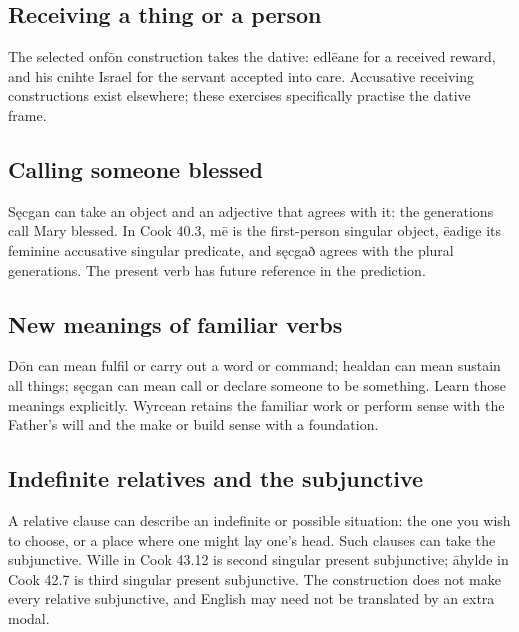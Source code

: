 \subsection*{Receiving a thing or a person}

The selected onfōn construction takes the dative: edlēane for a received reward, and his cnihte Israel for the servant accepted into care. Accusative receiving constructions exist elsewhere; these exercises specifically practise the dative frame.

\subsection*{Calling someone blessed}

Sęcgan can take an object and an adjective that agrees with it: the generations call Mary blessed. In Cook 40.3, mē is the first-person singular object, ēadige its feminine accusative singular predicate, and sęcgað agrees with the plural generations. The present verb has future reference in the prediction.

\subsection*{New meanings of familiar verbs}

Dōn can mean fulfil or carry out a word or command; healdan can mean sustain all things; sęcgan can mean call or declare someone to be something. Learn those meanings explicitly. Wyrcean retains the familiar work or perform sense with the Father’s will and the make or build sense with a foundation.

\subsection*{Indefinite relatives and the subjunctive}

A relative clause can describe an indefinite or possible situation: the one you wish to choose, or a place where one might lay one’s head. Such clauses can take the subjunctive. Wille in Cook 43.12 is second singular present subjunctive; āhylde in Cook 42.7 is third singular present subjunctive. The construction does not make every relative subjunctive, and English may need not be translated by an extra modal.

